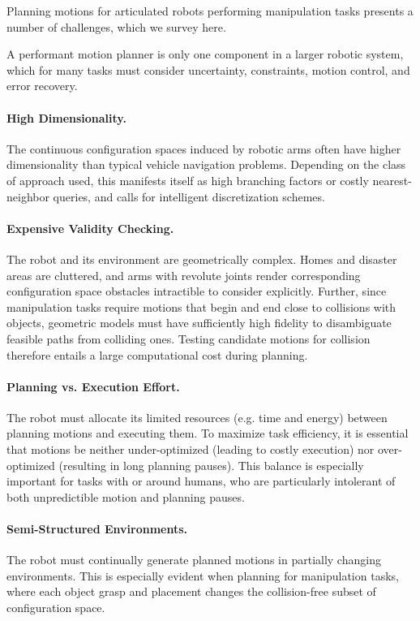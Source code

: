Planning motions for articulated robots performing manipulation tasks
presents a number of challenges,
which we survey here.

A performant motion planner is only one component in a larger
robotic system,
which for many tasks must consider uncertainty, constraints,
motion control, and error recovery.

\paragraph{High Dimensionality.}
The continuous configuration spaces induced by robotic arms
often have higher dimensionality than typical vehicle navigation
problems.
Depending on the class of approach used,
this manifests itself as high branching factors
or costly nearest-neighbor queries,
and calls for intelligent discretization schemes.

\paragraph{Expensive Validity Checking.}
The robot and its environment are geometrically complex.
Homes and disaster areas are cluttered,
and arms with revolute joints render corresponding 
configuration space obstacles intractible to consider explicitly.
Further, since manipulation tasks require
motions that begin and end close to collisions with objects,
geometric models must have sufficiently high fidelity
to disambiguate feasible paths from colliding ones.
Testing candidate motions for collision therefore entails a
large computational cost during planning.

\paragraph{Planning vs. Execution Effort.}
The robot must allocate its limited resources
(e.g. time and energy) between planning motions and executing them.
To maximize task efficiency,
it is essential that motions be neither under-optimized
(leading to costly execution)
nor over-optimized (resulting in long planning pauses).
This balance is especially important for tasks with or around
humans,
who are particularly intolerant of both unpredictible motion
and planning pauses.

\paragraph{Semi-Structured Environments.}
The robot must continually generate planned motions in partially
changing environments.
This is especially evident when planning for manipulation tasks,
where each object grasp and placement changes the collision-free
subset of configuration space.

